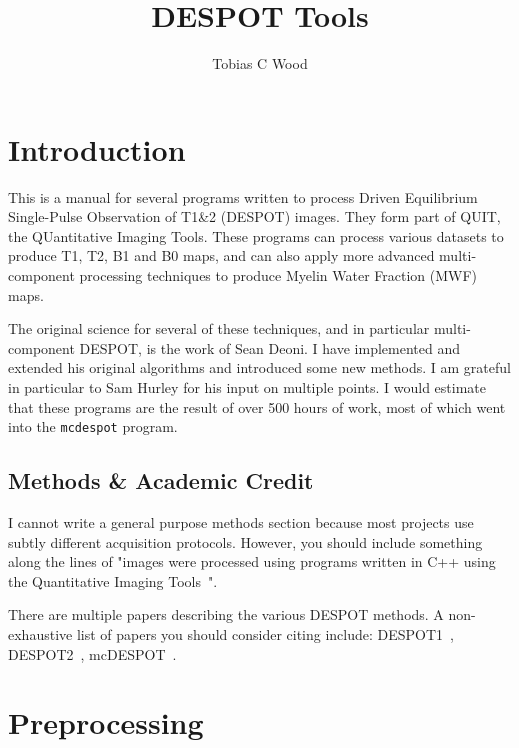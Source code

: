 \documentclass{report}
\begin{document}
\title{DESPOT Tools}
\author{Tobias C Wood}
\maketitle

\tableofcontents

\chapter{Introduction}

This is a manual for several programs written to process Driven Equilibrium Single-Pulse Observation of T1\&2 (DESPOT) images. They form part of QUIT, the QUantitative Imaging Tools. These programs can process various datasets to produce T1, T2, B1 and B0 maps, and can also apply more advanced multi-component processing techniques to produce Myelin Water Fraction (MWF) maps.

The original science for several of these techniques, and in particular multi-component DESPOT, is the work of Sean Deoni. I have implemented and extended his original algorithms and introduced some new methods. I am grateful in particular to Sam Hurley for his input on multiple points. I would estimate that these programs are the result of over 500 hours of work, most of which went into the \texttt{mcdespot} program.

\section{Methods & Academic Credit}\label{credit}

I cannot write a general purpose methods section because most projects use subtly different acquisition protocols. However, you should include something along the lines of "images were processed using programs written in C++ using the Quantitative Imaging Tools~\cite{quitweb}".

There are multiple papers describing the various DESPOT methods. A non-exhaustive list of papers you should consider citing include: DESPOT1~\cite{Deoni:2007}, DESPOT2~\cite{Deoni:2009a}, mcDESPOT~\cite{Deoni:2008c, Deoni:2012}.

\printbibliography[heading=subbibliography]

\chapter{Preprocessing}
\end{document}
